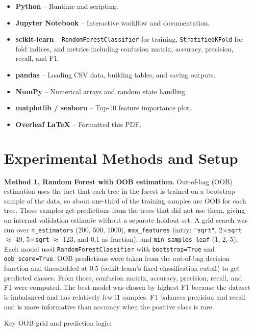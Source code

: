 \documentclass[11pt]{article}
\begin{document}
\begin{itemize}[leftmargin=1.5em]
    \item \textbf{Python} -- Runtime and scripting.
    \item \textbf{Jupyter Notebook} -- Interactive workflow and documentation.
    \item \textbf{scikit-learn} -- \texttt{RandomForestClassifier} for training, \texttt{StratifiedKFold} for fold indices, and metrics including confusion matrix, accuracy, precision, recall, and F1.
    \item \textbf{pandas} -- Loading CSV data, building tables, and saving outputs.
    \item \textbf{NumPy} -- Numerical arrays and random state handling.
    \item \textbf{matplotlib / seaborn} -- Top-10 feature importance plot.
    \item \textbf{Overleaf LaTeX} -- Formatted this PDF.
\end{itemize}

\section{Experimental Methods and Setup}

\textbf{Method 1, Random Forest with OOB estimation.} Out-of-bag (OOB) estimation uses the fact that each tree in the forest is trained on a bootstrap sample of the data, so about one-third of the training samples are OOB for each tree. Those samples get predictions from the trees that did not use them, giving an internal validation estimate without a separate holdout set. A grid search was run over \texttt{n\_estimators} (200, 500, 1000), \texttt{max\_features} (mtry: \texttt{"sqrt"}, 2$\times$\texttt{sqrt} $\approx$ 49, 5$\times$\texttt{sqrt} $\approx$ 123, and 0.1 as fraction), and \texttt{min\_samples\_leaf} (1, 2, 5). Each model used \texttt{RandomForestClassifier} with \texttt{bootstrap=True} and \texttt{oob\_score=True}. OOB predictions were taken from the out-of-bag decision function and thresholded at 0.5 (scikit-learn's fixed classification cutoff) to get predicted classes. From those, confusion matrix, accuracy, precision, recall, and F1 were computed. The best model was chosen by highest F1 because the dataset is imbalanced and has relatively few i1 samples. F1 balances precision and recall and is more informative than accuracy when the positive class is rare.

Key OOB grid and prediction logic:
\end{document}
